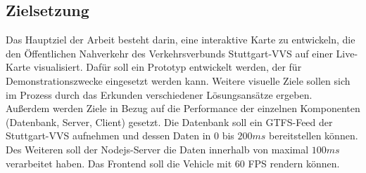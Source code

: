 \subsection{Zielsetzung}
\label{sub:zielsetzung}
  
  Das Hauptziel der Arbeit besteht darin, eine interaktive Karte zu entwickeln, die den Öffentlichen Nahverkehr des Verkehrsverbunds Stuttgart-VVS auf einer Live-Karte visualisiert. Dafür soll ein Prototyp entwickelt werden, der für Demonstrationszwecke eingesetzt werden kann. Weitere visuelle Ziele sollen sich im Prozess durch das Erkunden verschiedener Lösungsansätze ergeben. \\

  Außerdem werden Ziele in Bezug auf die Performance der einzelnen Komponenten (Datenbank, Server, Client) gesetzt. Die Datenbank soll ein GTFS-Feed der Stuttgart-VVS aufnehmen und dessen Daten in $0$ bis $200ms$ bereitstellen können. Des Weiteren soll der Nodejs-Server die Daten innerhalb von maximal $100ms$ verarbeitet haben. Das Frontend soll die Vehicle mit 60 FPS rendern können.\\

  
